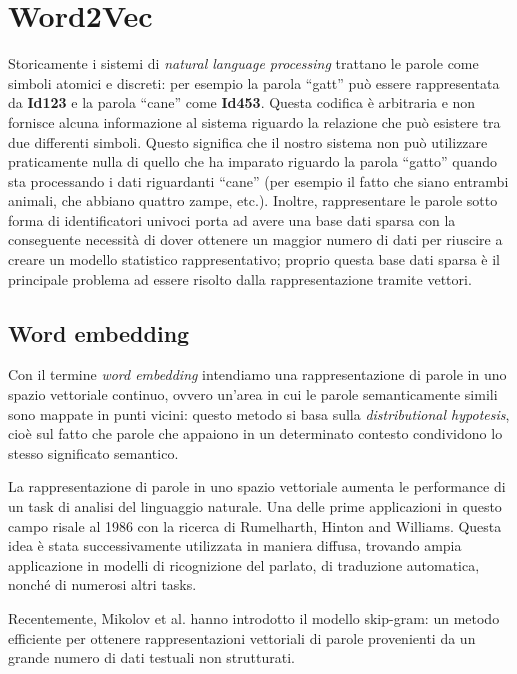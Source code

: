 \documentclass[a4paper,12pt,openright,twoside]{report}
\theoremstyle{definition}
\begin{document}
\section{Word2Vec}
\label{sec:word2vec}
Storicamente i sistemi di \emph{natural language processing} trattano le parole come simboli atomici e discreti:
per esempio la parola ``gatt'' può essere rappresentata da \textbf{Id123} e la parola ``cane'' come \textbf{Id453}.
Questa codifica è arbitraria e non fornisce alcuna informazione al sistema riguardo la relazione
che può esistere tra due differenti simboli.
Questo significa che il nostro sistema non può utilizzare praticamente nulla di quello che ha imparato
riguardo la parola ``gatto'' quando sta processando i dati riguardanti ``cane'' (per esempio il fatto che siano
entrambi animali, che abbiano quattro zampe, etc.).
Inoltre, rappresentare le parole sotto forma di identificatori univoci porta ad avere una base dati sparsa
con la conseguente necessità di dover ottenere un maggior numero di dati per riuscire a creare un modello
statistico rappresentativo; proprio questa base dati sparsa è il principale problema 
ad essere risolto dalla rappresentazione tramite vettori.

\subsection{Word embedding}
Con il termine \emph{word embedding} intendiamo una rappresentazione di parole in uno spazio vettoriale 
continuo, ovvero un'area in cui le parole
semanticamente simili sono mappate in punti vicini: questo metodo si basa sulla \emph{distributional hypotesis}, 
cioè sul fatto che parole che appaiono in 
un determinato contesto condividono lo stesso significato semantico.

La rappresentazione di parole in uno spazio vettoriale aumenta le performance
di un task di analisi del linguaggio naturale. Una delle prime
applicazioni in questo campo risale al 1986 con la ricerca di Rumelharth, Hinton and Williams.
Questa idea è stata successivamente utilizzata in maniera diffusa, trovando ampia 
applicazione in modelli di ricognizione del parlato,
di traduzione automatica, nonché di numerosi altri tasks.

Recentemente, Mikolov et al. hanno introdotto il modello skip-gram: 
un metodo efficiente per ottenere
rappresentazioni vettoriali di parole provenienti da un grande numero di dati testuali non strutturati.
\end{document}
